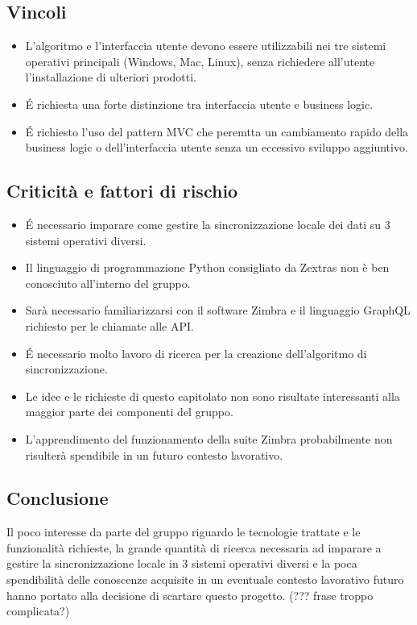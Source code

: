 \subsection{Vincoli}
\begin{itemize}
\item L'algoritmo e l'interfaccia utente devono essere utilizzabili nei tre sistemi operativi principali (Windows, Mac, Linux), senza richiedere all'utente l'installazione di ulteriori prodotti.
\item É richiesta una forte distinzione tra interfaccia utente e business logic.
\item É richiesto l'uso del pattern MVC che peremtta un cambiamento rapido della business logic o dell'interfaccia utente senza un eccessivo sviluppo aggiuntivo.
\end{itemize}

\subsection{Criticità e fattori di rischio}
\begin{itemize}
\item É necessario imparare come gestire la sincronizzazione locale dei dati su 3 sistemi operativi diversi.
\item Il linguaggio di programmazione Python consigliato da Zextras non è ben conosciuto all'interno del gruppo.
\item Sarà necessario familiarizzarsi con il software Zimbra e il linguaggio GraphQL richiesto per le chiamate alle API.
\item É necessario molto lavoro di ricerca per la creazione dell'algoritmo di sincronizzazione.
\item Le idee e le richieste di questo capitolato non sono risultate interessanti alla maggior parte dei componenti del gruppo.
\item L'apprendimento del funzionamento della suite Zimbra probabilmente non risulterà spendibile in un futuro contesto lavorativo.
\end{itemize}

\subsection{Conclusione}
Il poco interesse da parte del gruppo riguardo le tecnologie trattate e le funzionalità richieste, la grande quantità di ricerca necessaria ad imparare a gestire la sincronizzazione locale in 3 sistemi operativi diversi e la poca spendibilità delle conoscenze acquisite in un eventuale contesto lavorativo futuro hanno portato alla decisione di scartare questo progetto. (??? frase troppo complicata?)
